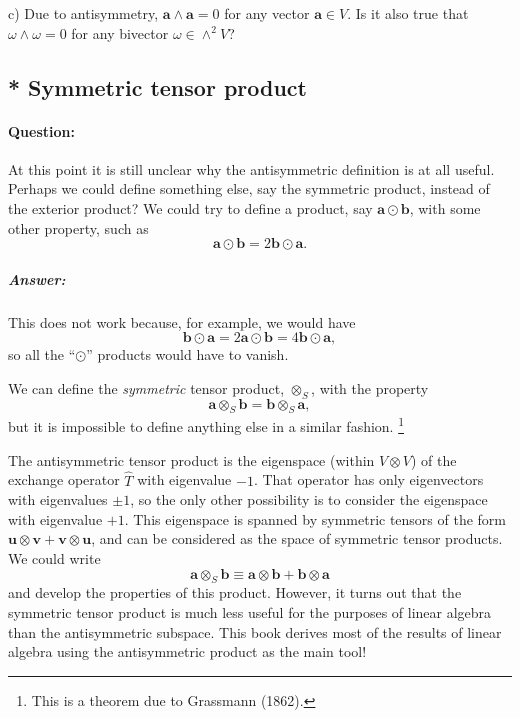 c) Due to antisymmetry,  $\mathbf{a}\wedge\mathbf{a}=0$ for any vector
$\mathbf{a}\in V$. Is it also true that $\omega\wedge\omega=0$ for
any bivector $\omega\in\wedge^{2}V$?


\subsection{{*} Symmetric tensor product}


\paragraph{Question:}

At this point it is still unclear why the antisymmetric definition
is at all useful. Perhaps we could define something else, say the
symmetric product, instead of the exterior product? We could try to
define a product, say $\mathbf{a}\odot\mathbf{b}$, with some other
property, such as\[
\mathbf{a}\odot\mathbf{b}=2\mathbf{b}\odot\mathbf{a}.\]



\subparagraph{Answer:}

This does not work because, for example, we would have\[
\mathbf{b}\odot\mathbf{a}=2\mathbf{a}\odot\mathbf{b}=4\mathbf{b}\odot\mathbf{a},\]
so all the {}``$\odot$'' products would have to vanish.

We can define the \emph{symmetric} tensor product, $\otimes_{S}$,
with the property\[
\mathbf{a}\otimes_{S}\mathbf{b}=\mathbf{b}\otimes_{S}\mathbf{a},\]
but it is impossible to define anything else in a similar fashion.%
\footnote{This is a theorem due to Grassmann (1862).%
} 

The antisymmetric tensor product is the eigenspace (within $V\otimes V$)
of the exchange operator $\hat{T}$ with eigenvalue $-1$. That operator
has only eigenvectors with eigenvalues $\pm1$, so the only other
possibility is to consider the eigenspace with eigenvalue $+1$. This
eigenspace is spanned by symmetric tensors of the form $\mathbf{u}\otimes\mathbf{v}+\mathbf{v}\otimes\mathbf{u}$,
and can be considered as the space of symmetric tensor products. We
could write\[
\mathbf{a}\otimes_{S}\mathbf{b}\equiv\mathbf{a}\otimes\mathbf{b}+\mathbf{b}\otimes\mathbf{a}\]
and develop the properties of this product. However, it turns out
that the symmetric tensor product is much less useful for the purposes
of linear algebra than the antisymmetric subspace. This book derives
most of the results of linear algebra using the antisymmetric product
as the main tool!


